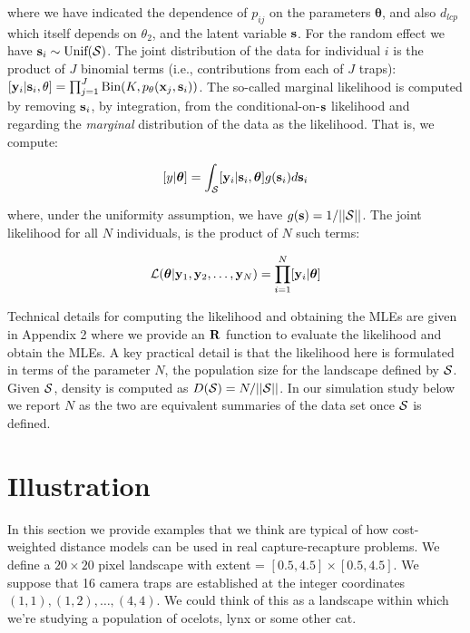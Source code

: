 \documentclass[12pt]{article}
\begin{document}
\begin{spacing}{1.8}
{\flushleft where} we have indicated the dependence of $p_{ij}$ on the parameters
${\bm \theta}$, and also $d_{lcp}$ which
itself depends on $\theta_{2}$, and the latent variable ${\bf s}$.
For the random effect we have ${\bf s}_{i} \sim  \mbox{Unif}({\cal
  S})$.
The joint distribution of the data for individual $i$ is the product
of $J$ binomial terms (i.e., contributions from each of $J$ traps):
$  [{\bf y}_{i} | {\bf s}_{i} , \theta] =
  \prod_{j=1}^{J} \mbox{Bin}(K, p_{\theta}({\bf x}_{j},{\bf s}_{i}) )$.
 The so-called marginal likelihood is computed by removing
${\bf s}_{i}$, by integration,  from the conditional-on-${\bf s}$
likelihood and regarding the {\it marginal} distribution of the data
as the likelihood. That
is, we compute:

\[
  [y|{\bm \theta}] =
\int_{{\cal S}}  [ {\bf y}_{i} |{\bf s}_{i},{\bm \theta}] g({\bf s}_{i}) d{\bf s}_{i}
\]

{\flushleft where}, under the uniformity assumption, we have
$g({\bf s}) = 1/||{\cal S}||$.
The joint likelihood for all $N$ individuals, 
is the product of $N$ such terms:

\[
{\cal L}({\bm \theta} | {\bf y}_{1},{\bf y}_{2},\ldots, {\bf y}_{N}) = \prod_{i=1}^{N}
[{\bf y}_{i}|{\bm \theta}]
\]

Technical details for computing the likelihood and obtaining the MLEs
are given in Appendix 2 where we provide an ${\bf R}$ function
to evaluate the likelihood and obtain the MLEs.
A key practical detail is that the likelihood here is formulated in
terms of the parameter $N$, the population size for the landscape
defined by ${\cal S}$. Given ${\cal S}$, density
is
computed as $D({\cal S}) = N/||{\cal S}||$. In our simulation study
below we report $N$ as the two are equivalent summaries of the data
set once ${\cal S}$ is defined.


\section{Illustration}

In this section we provide examples that we think are typical of how
cost-weighted distance models can be used in real capture-recapture
problems.  We define a $20 \times 20$ pixel landscape with 
extent = $[0.5, 4.5] \times [0.5, 4.5]$.  
We suppose that 16 camera traps are established at the integer coordinates
$(1,1), (1,2), \ldots, (4,4)$. We could think of this as a landscape
within which we're studying a population of ocelots, lynx or some
other cat.


\end{spacing}
\end{document}
